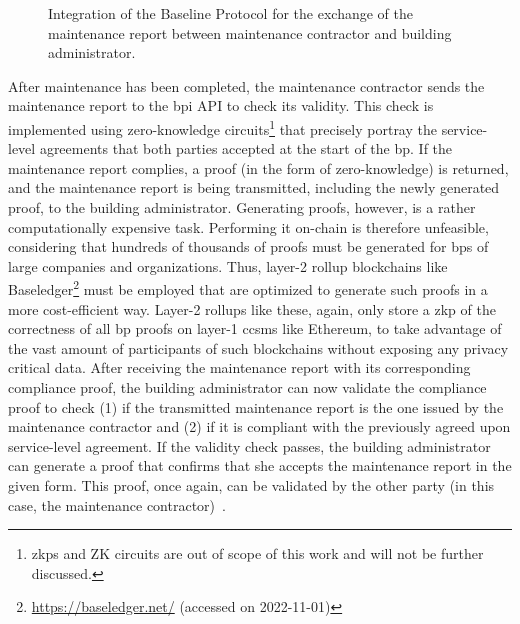 \begin{figure}[h]
    \caption{Integration of the Baseline Protocol for the exchange of the maintenance report between maintenance contractor and building administrator.}
    \label{fig:background:maintenance_report_baseline}
\end{figure}

After maintenance has been completed, the maintenance contractor sends the maintenance report to the \gls{bpi} API to check its validity. This check is implemented using zero-knowledge circuits\footnote{\glspl{zkp} and ZK circuits are out of scope of this work and will not be further discussed.} that precisely portray the service-level agreements that both parties accepted at the start of the \gls{bp}. If the maintenance report complies, a proof (in the form of zero-knowledge) is returned, and the maintenance report is being transmitted, including the newly generated proof, to the building administrator. Generating proofs, however, is a rather computationally expensive task. Performing it on-chain is therefore unfeasible, considering that hundreds of thousands of proofs must be generated for \glspl{bp} of large companies and organizations. Thus, layer-2 rollup blockchains like Baseledger\footnote{\url{https://baseledger.net/} (accessed on 2022-11-01)} must be employed that are optimized to generate such proofs in a more cost-efficient way. Layer-2 rollups like these, again, only store a \gls{zkp} of the correctness of all \gls{bp} proofs on layer-1 \glspl{ccsm} like Ethereum, to take advantage of the vast amount of participants of such blockchains without exposing any privacy critical data. After receiving the maintenance report with its corresponding compliance proof, the building administrator can now validate the compliance proof to check (1) if the transmitted maintenance report is the one issued by the maintenance contractor and (2) if it is compliant with the previously agreed upon service-level agreement. If the validity check passes, the building administrator can generate a proof that confirms that she accepts the maintenance report in the given form. This proof, once again, can be validated by the other party (in this case, the maintenance contractor)~\cite{baseline_spec}.

